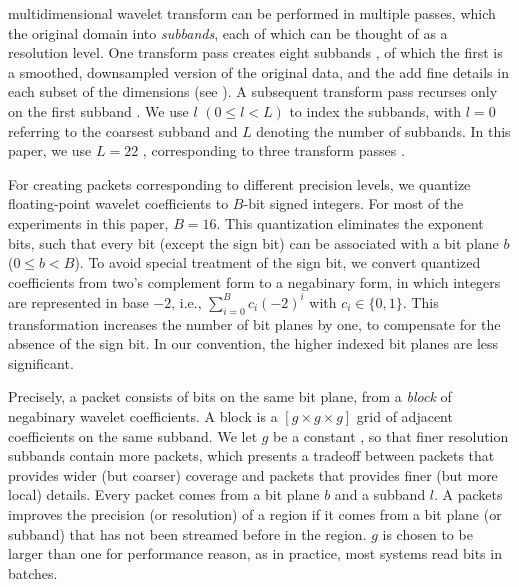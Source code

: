   multidimensional wavelet transform can be performed in multiple passes, 
which   the original domain  into  
\emph{subbands}, each of which can be thought
of as a resolution level. One transform pass  creates eight subbands , 
of which the first is a
smoothed, downsampled version of the original data, and the   
add fine details in each subset of the dimensions (see 
). A subsequent
transform pass recurses only on the first subband . We use $l$ $(0 \leq l < L)$ to index the
subbands, with $l = 0$ referring to the coarsest subband and $L$ denoting the number of subbands. In
this paper, we use $L=22$ , corresponding to three transform passes .

For creating packets corresponding to different precision levels, we quantize floating-point wavelet
coefficients to $B$-bit signed integers. For most of the experiments in this paper, $B=16$. This
quantization eliminates the exponent bits, such that every bit (except the sign bit) can be
associated with a bit plane $b$ ($0\leq b < B$). To avoid special treatment of the sign bit, we
convert quantized coefficients from two's complement form to a negabinary form, in which integers
are represented in base $-2$, i.e., $\sum_{i=0}^{B}{c_i(-2)^i}$ with $c_i\in \{0,1\}$. This
transformation increases the number of bit planes by one, to compensate for the absence of the sign
bit. In our convention, the higher indexed bit planes are less significant.

Precisely, a packet consists of bits on the same bit plane, from a \emph{block} of negabinary
wavelet coefficients. A block is a $[g\times g\times g]$ grid of adjacent coefficients on the same
subband.  We let $g$ be a constant 
, so that
finer resolution subbands contain more packets, which presents a tradeoff between packets that
provides wider (but coarser) coverage and packets that provides finer (but more local) details.
Every packet comes from a bit plane $b$ and a subband $l$. A packets improves the precision (or
resolution) of a region if it comes from a bit plane (or subband) that has not been streamed before
in the region. $g$ is chosen to be larger than one for performance reason, as in practice, most
systems read bits in batches.

